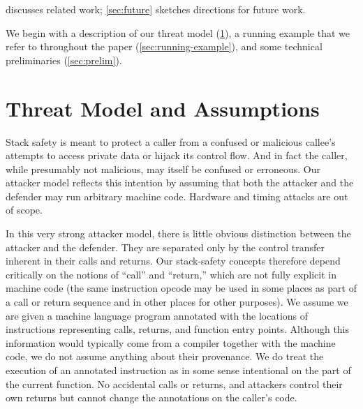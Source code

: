 \documentclass[acmsmall,review,anonymous]{acmart}\settopmatter{printfolios=true,printccs=false,printacmref=false}
\begin{document}
\begin{itemize}
\end{itemize}
 discusses related work;
\cref{sec:future} sketches directions for future work.

We begin with a description of our threat model
(\cref{sec:threat}), a running example that we refer to throughout the paper
(\cref{sec:running-example}),  and some technical preliminaries
(\cref{sec:prelim}).

\section{Threat Model and Assumptions}
\label{sec:threat}

Stack safety is meant to protect a caller from a confused or malicious callee's
attempts to access private data or hijack its control flow. And in fact the caller,
while presumably not malicious, may itself be confused or erroneous. Our attacker
model reflects this intention by assuming that both the attacker and the defender
may run arbitrary machine code. Hardware and timing attacks are out of scope.


\newcommand*{\rsp}{\textsc{sp}}

In this very strong attacker model, there is little obvious distinction between
the attacker and the defender. They are separated only by the control transfer
inherent in their calls and returns. Our stack-safety concepts therefore depend
critically on the notions of ``call'' and ``return,'' which are not fully explicit
in machine code (the same instruction opcode may be used in some places as part of
a call or return sequence and in other places for other purposes).
%
We assume we are given a machine language program annotated with the locations of
instructions representing calls, returns, and function entry points. Although this
information would typically come from a compiler together with the machine code,
we do not assume anything about their provenance. We do treat the execution of an
annotated instruction as in some sense intentional on the part of the current
function. No accidental calls or returns, and attackers control their own returns
but cannot change the annotations on the caller's code.
\end{document}
